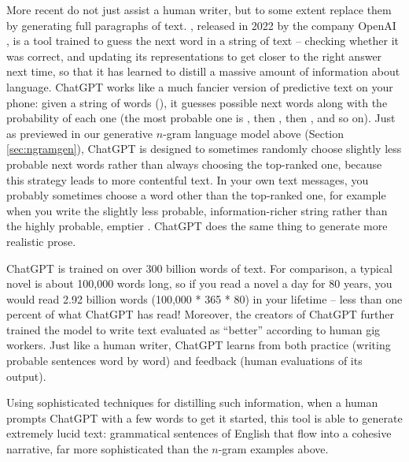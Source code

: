 More recent   do not just assist a human writer, but to some extent replace them by generating full paragraphs of text. , released in 2022 by the company OpenAI \citep{Ouyang-etal:2022}, is a tool trained to guess the next word in a string of text -- checking whether it was correct, and updating its representations to get closer to the right answer next time, so that it has learned to distill a massive amount of information about language.  ChatGPT works like a much fancier version of predictive text on your phone: given a string of words (), it  guesses possible next words along with the probability of each one (the most probable one is , then , then , and so on).  Just as previewed in our generative $n$-gram language model above (Section \ref{sec:ngramgen}), ChatGPT is designed to sometimes randomly choose slightly less probable next words rather than always choosing the top-ranked one, because this strategy leads to more contentful text.  In your own text messages, you probably sometimes choose a word other than the top-ranked one, for example when you write the slightly less probable, information-richer string  rather than the highly probable, emptier .  ChatGPT does the same thing to generate more realistic prose. 

ChatGPT is trained on over 300 billion words of text.  For comparison, a typical novel is about 100,000 words long, so if you read a novel a day for 80 years, you would read 2.92 billion words (100,000 * 365 * 80) in your lifetime -- less than one percent of what ChatGPT has read!  Moreover, the creators of ChatGPT further trained the model to write text evaluated as ``better'' according to human gig workers.  Just like a human writer, ChatGPT learns from both practice (writing probable sentences word by word) and feedback (human evaluations of its output).

Using sophisticated techniques for distilling such information, when a human prompts ChatGPT with a few words to get it started, this tool is able to generate extremely lucid text: grammatical sentences of English that flow into a cohesive narrative, far more sophisticated than the $n$-gram examples above.  

